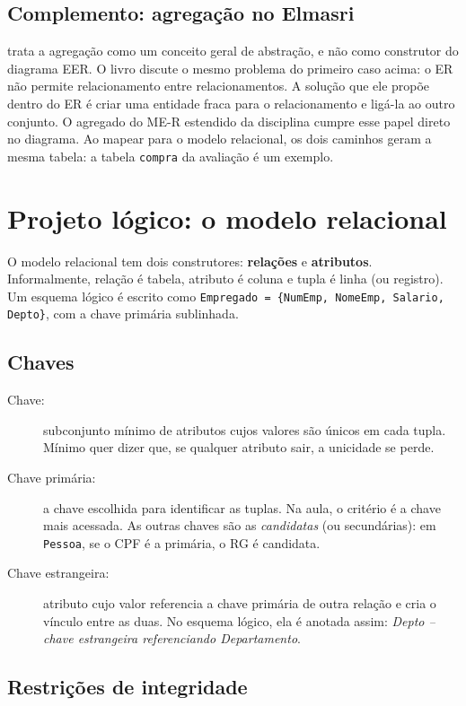 \subsection*{Complemento: agregação no Elmasri}

\textcite[seção 8.7]{Elmasri2011} trata a agregação como um conceito
geral de abstração, e não como construtor do diagrama EER. O livro
discute o mesmo problema do primeiro caso acima: o ER não permite
relacionamento entre relacionamentos. A solução que ele propõe dentro do
ER é criar uma entidade fraca para o relacionamento e ligá-la ao outro
conjunto. O agregado do ME-R estendido da disciplina cumpre esse papel
direto no diagrama. Ao mapear para o modelo relacional, os dois caminhos
geram a mesma tabela: a tabela \texttt{compra} da avaliação é um exemplo.

\section{Projeto lógico: o modelo relacional}

O modelo relacional tem dois construtores:
\textbf{relações} e \textbf{atributos}. Informalmente, relação é tabela,
atributo é coluna e tupla é linha (ou registro). Um esquema lógico é
escrito como \texttt{Empregado = \{NumEmp, NomeEmp, Salario, Depto\}},
com a chave primária sublinhada.

\subsection{Chaves}

\begin{description}
	\item[Chave:] subconjunto mínimo de atributos cujos valores são únicos
	em cada tupla. Mínimo quer dizer que, se qualquer atributo sair, a
	unicidade se perde.
	\item[Chave primária:] a chave escolhida para identificar as tuplas.
	Na aula, o critério é a chave mais acessada. As outras chaves são as
	\emph{candidatas} (ou secundárias): em \texttt{Pessoa}, se o CPF é a
	primária, o RG é candidata.
	\item[Chave estrangeira:] atributo cujo valor referencia a chave
	primária de outra relação e cria o vínculo entre as duas. No esquema
	lógico, ela é anotada assim: \emph{Depto -- chave estrangeira
	referenciando Departamento}.
\end{description}

\subsection{Restrições de integridade}

